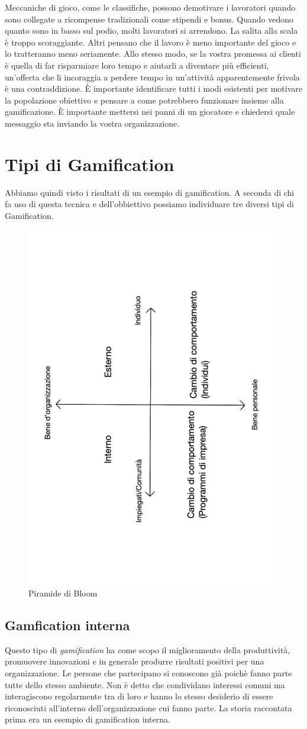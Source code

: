 \begin{itemize}
  Meccaniche di gioco, come le classifiche, possono demotivare i lavoratori quando sono collegate a ricompense tradizionali come stipendi e bonus. Quando vedono quanto sono in basso sul podio, molti lavoratori si arrendono.
La salita alla scala è troppo scoraggiante. Altri pensano che il lavoro è meno importante del gioco e lo tratteranno meno seriamente. Allo stesso modo, se la vostra promessa ai clienti è quella di far risparmiare loro tempo e aiutarli a diventare più efficienti, un'offerta che li incoraggia a perdere tempo in un'attività apparentemente frivola è una contraddizione.
È importante identificare tutti i modi esistenti per motivare la popolazione obiettivo e pensare a come potrebbero funzionare insieme alla gamificazione. È importante mettersi nei panni di un giocatore e chiedersi quale messaggio sta inviando la vostra organizzazione.
\end{itemize}

\section{Tipi di Gamification}
Abbiamo quindi visto i risultati di un esempio di gamification. A seconda di chi fa uso di questa tecnica e dell'obbiettivo possiamo individuare tre diversi tipi di Gamification.
\begin{figure}[h!]
  \centerline{\includegraphics[height = 9 cm, width= 6 cm, angle=270]{figures/assi.pdf}}
  \caption{Piramide di Bloom}
\end{figure}
\subsection{Gamfication interna}
Questo tipo di \textit{gamification} ha come scopo il miglioramento della produttività, promuovere innovazioni e in generale produrre risultati positivi per una organizzazione. Le persone che partecipano si conoscono già poichè fanno parte tutte dello stesso ambiente. Non è detto che condividano interessi comuni ma interagiscono regolarmente tra di loro e hanno lo stesso desiderio di essere riconosciuti all'interno dell'organizzazione cui fanno parte. La storia raccontata prima era un esempio di gamification interna.

